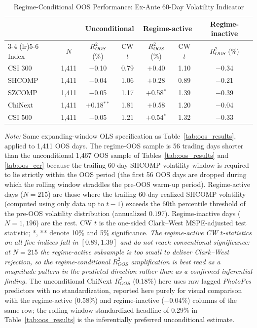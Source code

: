 \documentclass[AER]{AEA}
\begin{document}
\begin{table}[h!]
    \centering
    \caption{Regime-Conditional OOS Performance: Ex-Ante 60-Day Volatility Indicator}
    \label{tab:oos_regime}
    \setlength{\tabcolsep}{4pt}
    \footnotesize
    \begin{tabular}{lcccccc}
    \toprule
    & & \multicolumn{2}{c}{Unconditional} & \multicolumn{2}{c}{Regime-active} & Regime-inactive \\
    \cmidrule(lr){3-4} \cmidrule(lr){5-6}
    Index & $N$ & $R^2_{OOS}$ (\%) & CW $t$ & $R^2_{OOS}$ (\%) & CW $t$ & $R^2_{OOS}$ (\%) \\
    \midrule
    CSI 300         & 1{,}411 & $-$0.10  & 0.79      & $+$0.40  & 1.10      & $-$0.34 \\
    SHCOMP          & 1{,}411 & $-$0.04  & 1.06      & $+$0.28  & 0.89      & $-$0.21 \\
    SZCOMP          & 1{,}411 & $-$0.05  & 1.17      & $+$0.58$^{*}$ & 1.39 & $-$0.39 \\
    ChiNext         & 1{,}411 & $+$0.18$^{**}$ & 1.81 & $+$0.58 & 1.20      & $-$0.04 \\
    CSI 500         & 1{,}411 & $-$0.05  & 1.21      & $+$0.54$^{*}$ & 1.32 & $-$0.33 \\
    \bottomrule
    \end{tabular}
    \vspace{0.2cm}
    \footnotesize
    \textit{Note:} Same expanding-window OLS specification as Table~\ref{tab:oos_results}, applied to 1{,}411 OOS days. The regime-OOS sample is 56 trading days shorter than the unconditional 1{,}467 OOS sample of Tables~\ref{tab:oos_results} and \ref{tab:oos_cer} because the trailing 60-day SHCOMP volatility window is required to lie strictly within the OOS period (the first 56 OOS days are dropped during which the rolling window straddles the pre-OOS warm-up period). Regime-active days ($N=215$) are those where the trailing 60-day realized SHCOMP volatility (computed using only data up to $t-1$) exceeds the 60th percentile threshold of the pre-OOS volatility distribution (annualized $0.197$). Regime-inactive days ($N=1{,}196$) are the rest. CW $t$ is the one-sided Clark--West MSPE-adjusted test statistic; *, ** denote 10\% and 5\% significance. \textit{The regime-active CW $t$-statistics on all five indices fall in $[0.89, 1.39]$ and do not reach conventional significance: at $N=215$ the regime-active subsample is too small to deliver Clark--West rejection, so the regime-conditional $R^2_{OOS}$ amplification is best read as a magnitude pattern in the predicted direction rather than as a confirmed inferential finding.} The unconditional ChiNext $R^2_{OOS}$ (0.18\%) here uses raw lagged \textit{PhotoPes} predictors with no standardization, reported here purely for visual comparison with the regime-active (0.58\%) and regime-inactive ($-$0.04\%) columns of the same row; the rolling-window-standardized headline of 0.29\% in Table~\ref{tab:oos_results} is the inferentially preferred unconditional estimate.
\end{table}
\end{document}
